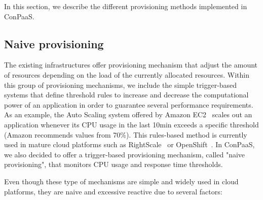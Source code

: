 In this section, we describe the different provisioning methods implemented in ConPaaS.



\subsection{Naive provisioning}


The existing infrastructures offer provisioning mechanism that adjust the amount of resources depending on the load of the currently allocated resources. Within this group of provisioning mechanisms, we include the simple trigger-based systems that define threshold rules to increase and decrease the computational power of an application in order to guarantee several performance requirements. As an example, the Auto Scaling system offered by Amazon EC2~\cite{amazonEC2} scales out an application whenever its CPU usage in the last 10min exceeds a specific threshold (Amazon recommends values from 70\%).  This rules-based method is currently used in mature cloud platforms such as RightScale~\cite{right-scale} or OpenShift~\cite{openshift}. In ConPaaS, we also decided to offer a trigger-based provisioning mechanism, called "naive provisioning", that monitors CPU usage and response time thresholds. 


Even though these type of mechanisms are simple and widely used in cloud platforms, they are naive and excessive reactive due to several factors: 


